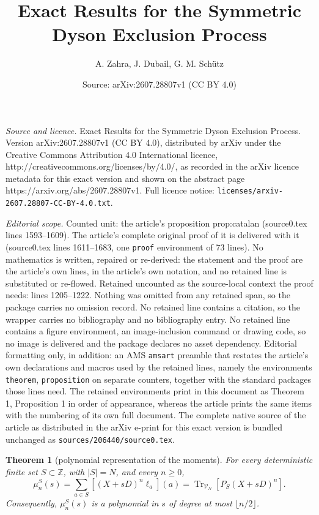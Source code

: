 \documentclass[10pt,a4paper]{amsart}
\title{Exact Results for the Symmetric Dyson Exclusion Process}
\author{A. Zahra, J. Dubail, G. M. Sch\"utz}
\date{Source: arXiv:2607.28807v1 (CC BY 4.0)}
\newtheorem{theorem}{Theorem}
\begin{document}
\maketitle

\noindent\emph{Source and licence.} Exact Results for the Symmetric Dyson Exclusion Process. Version arXiv:2607.28807v1 (CC BY 4.0), distributed by arXiv under the Creative Commons Attribution 4.0 International licence, http://creativecommons.org/licenses/by/4.0/, as recorded in the arXiv licence metadata for this exact version and shown on the abstract page https://arxiv.org/abs/2607.28807v1. Full licence notice: \texttt{licenses/arxiv-2607.28807-CC-BY-4.0.txt}.\par\smallskip

\noindent\textit{Editorial scope.} Counted unit: the article's proposition prop:catalan (source0.tex lines 1593--1609). The article's complete original proof of it is delivered with it (source0.tex lines 1611--1683, one \texttt{proof} environment of 73 lines). No mathematics is written, repaired or re-derived: the statement and the proof are the article's own lines, in the article's own notation, and no retained line is substituted or re-flowed.  Retained uncounted as the source-local context the proof needs: lines 1205--1222.  Nothing was omitted from any retained span, so the package carries no omission record.  No retained line contains a citation, so the wrapper carries no bibliography and no bibliography entry.  No retained line contains a figure environment, an image-inclusion command or drawing code, so no image is delivered and the package declares no asset dependency.  Editorial formatting only, in addition: an AMS \texttt{amsart} preamble that restates the article's own declarations and macros used by the retained lines, namely the environments \texttt{theorem}, \texttt{proposition} on separate counters, together with the standard packages those lines need.  The retained environments print in this document as Theorem 1, Proposition 1 in order of appearance, whereas the article prints the same items with the numbering of its own full document.  The complete native source of the article as distributed in the arXiv e-print for this exact version is bundled unchanged as \texttt{sources/206440/source0.tex}.
\begin{theorem}[polynomial representation of the moments]
\label{prop:moment_operator_representation}
For every deterministic finite set \(S\subset\mathbb Z\), with \(|S|=N\), and
every \(n\geq0\),
\begin{equation}
    \mu_n^S(s)
    =
    \sum_{a\in S}
    \left[(X+sD)^n\ell_a\right](a)
    =  \operatorname{Tr}_{\mathcal V_N}
    \left[
    P_S(X+sD)^n
    \right].
\label{eq:moment_operator_representation}
\end{equation}
Consequently, \(\mu_n^S(s)\) is a polynomial in \(s\) of degree at most
\(\lfloor n/2\rfloor\).
\end{theorem}
\end{document}
